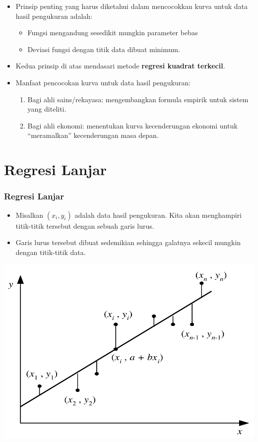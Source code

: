 \documentclass[pdflatex,compress,mathserif]{beamer}
\begin{document}
\begin{frame}
	\begin{itemize}
		\item Prinsip penting yang harus diketahui dalam mencocokkan
kurva untuk data hasil pengukuran adalah:
		\begin{itemize}
			\item Fungsi mengandung sesedikit mungkin parameter bebas
			\item Deviasi fungsi dengan titik data dibuat minimum.
		\end{itemize}
		\item Kedua prinsip di atas mendasari metode \textbf{regresi kuadrat
		terkecil}.
		\item Manfaat pencocokan kurva untuk data hasil pengukuran:
		\begin{enumerate}
			\item Bagi ahli sains/rekayasa: mengembangkan formula empirik
untuk sistem yang diteliti.
			\item Bagi ahli ekonomi: menentukan kurva kecenderungan
ekonomi untuk “meramalkan” kecenderungan masa
depan.
		\end{enumerate}
	\end{itemize}
\end{frame}

\section{Regresi Lanjar}

\begin{frame}
	\frametitle{Regresi Lanjar}
	\begin{itemize}
		\item Misalkan $ (x_i, y_i) $ adalah data hasil pengukuran. Kita akan
menghampiri titik-titik tersebut dengan sebuah garis lurus.
		\item Garis lurus tersebut dibuat sedemikian sehingga galatnya
sekecil mungkin dengan titik-titik data.
	\end{itemize}
	\begin{center}
		\includegraphics[width=0.5\linewidth]{img/img03}
	\end{center}
\end{frame}
\end{document}
